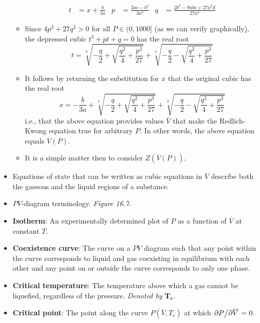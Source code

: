 \documentclass[../notes.tex]{subfiles}
\begin{document}
\begin{itemize}
\begin{itemize}
        \begin{align*}
            t &= x+\frac{b}{3a}&
            p &= \frac{3ac-b^2}{3a^2}&
            q &= \frac{2b^3-9abc+27a^2d}{27a^3}
        \end{align*}
        \item Since $4p^3+27q^2>0$ for all $P\in(0,1000]$ (as we can verify graphically), the depressed cubic $t^3+pt+q=0$ has the real root
        \begin{equation*}
            t = \sqrt[3]{-\frac{q}{2}+\sqrt{\frac{q^2}{4}+\frac{p^3}{27}}}+\sqrt[3]{-\frac{q}{2}-\sqrt{\frac{q^2}{4}+\frac{p^3}{27}}}
        \end{equation*}
        \item It follows by returning the substitution for $x$ that the original cubic has the real root
        \begin{equation*}
            x = -\frac{b}{3a}+\sqrt[3]{-\frac{q}{2}+\sqrt{\frac{q^2}{4}+\frac{p^3}{27}}}+\sqrt[3]{-\frac{q}{2}-\sqrt{\frac{q^2}{4}+\frac{p^3}{27}}}
        \end{equation*}
        i.e., that the above equation provides values $\overline{V}$ that make the Redlich-Kwong equation true for arbitrary $P$. In other words, the above equation equals $\overline{V}(P)$.
        \item It is a simple matter then to consider $Z(\overline{V}(P))$.
    \end{itemize}
    \item {}Equations of state that can be written as cubic equations in $\overline{V}$ describe both the gaseous and the liquid regions of a substance.
    \item $PV$-diagram terminology.
    \emph{Figure 16.7.}
    \item \textbf{Isotherm}: An experimentally determined plot of $P$ as a function of $\overline{V}$ at constant $T$.
    \item \textbf{Coexistence curve}: The curve on a $PV$ diagram such that any point within the curve corresponds to liquid and gas coexisting in equilibrium with each other and any point on or outside the curve corresponds to only one phase.
    \item \textbf{Critical temperature}: The temperature above which a gas cannot be liquefied, regardless of the pressure. \emph{Denoted by} $\bm{T_c}$.
    \item \textbf{Critical point}: The point along the curve $P(\overline{V},T_c)$ at which $\pdv*{P}{\overline{V}}=0$.
    \begin{itemize}

\end{itemize}
\end{itemize}
\end{document}
